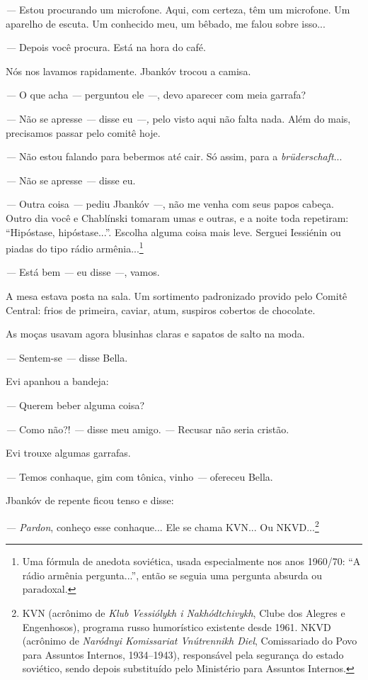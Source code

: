 \emph{---} Estou procurando um microfone. Aqui, com certeza, têm um
microfone. Um aparelho de escuta. Um conhecido meu, um bêbado, me falou
sobre isso...

\emph{---} Depois você procura. Está na hora do café.

Nós nos lavamos rapidamente. Jbankóv trocou a camisa.

\emph{---} O que acha \emph{---} perguntou ele \emph{---}, devo aparecer
com meia garrafa?

\emph{---} Não se apresse \emph{---} disse eu \emph{---,} pelo visto
aqui não falta nada. Além do mais, precisamos passar pelo comitê hoje.

\emph{---} Não estou falando para bebermos até cair. Só assim, para a
\emph{brüderschaft}...

\emph{---} Não se apresse \emph{---} disse eu.

\emph{---} Outra coisa \emph{---} pediu Jbankóv \emph{---}, não me venha
com seus papos cabeça. Outro dia você e Chablínski tomaram umas e
outras, e a noite toda repetiram: ``Hipóstase, hipóstase...''. Escolha
alguma coisa mais leve. Serguei Iessiénin ou piadas do tipo rádio
armênia...\footnote{Uma fórmula de anedota soviética, usada
  especialmente nos anos 1960/70: ``A rádio armênia pergunta...'', então
  se seguia uma pergunta absurda ou paradoxal.}

\emph{---} Está bem \emph{---} eu disse \emph{---}, vamos.

A mesa estava posta na sala. Um sortimento padronizado provido pelo
Comitê Central: frios de primeira, caviar, atum, suspiros cobertos de
chocolate.

As moças usavam agora blusinhas claras e sapatos de salto na moda.

\emph{---} Sentem-se \emph{---} disse Bella.

Evi apanhou a bandeja:

\emph{---} Querem beber alguma coisa?

\emph{---} Como não?! \emph{---} disse meu amigo. \emph{---} Recusar não
seria cristão.

Evi trouxe algumas garrafas.

\emph{---} Temos conhaque, gim com tônica, vinho \emph{---} ofereceu
Bella.

Jbankóv de repente ficou tenso e disse:

\emph{--- Pardon}, conheço esse conhaque... Ele se chama KVN... Ou
NKVD...\footnote{KVN (acrônimo de \emph{Klub Vessiólykh i
  Nakhódtchivykh}, Clube dos Alegres e Engenhosos), programa russo
  humorístico existente desde 1961. NKVD (acrônimo de \emph{Naródnyi
  Komissariat Vnútrennikh Diel}, Comissariado do Povo para Assuntos
  Internos, 1934--1943), responsável pela segurança do estado soviético,
  sendo depois substituído pelo Ministério para Assuntos Internos.}

